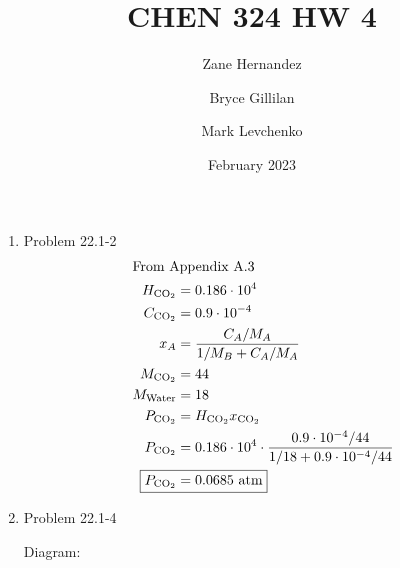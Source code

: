 \documentclass[12pt]{article}
\title{CHEN 324 HW 4}
\author[1]{Zane Hernandez}
\author[2]{Bryce Gillilan}
\author[3]{Mark Levchenko}
\affil[1,2,3]{Group 11}
\date{February 2023}
\begin{document}

\begin{enumerate}

\newpage
    \item Problem 22.1-2
    \begin{align*}
        \intertext{From Appendix A.3}
        H_{\mathrm{CO}_2} &= 0.186 \cdot 10^{4} \\
        C_{\mathrm{CO}_2} &= 0.9 \cdot 10^{-4} \\
        x_A &= \frac{C_A/M_A}{1/M_B + C_A/M_A} \\
        M_{\mathrm{CO}_2} &= 44 \\
        M_{\mathrm{Water}} &= 18 \\
        P_{\mathrm{CO}_2} &= H_{\mathrm{CO}_2} x_{\mathrm{CO}_2} \\
        P_{\mathrm{CO}_2} &= 0.186 \cdot 10^{4} \cdot \frac{0.9 \cdot 10^{-4}/44}{1/18 + 0.9 \cdot 10^{-4}/44} \\
        \Aboxed{P_{\mathrm{CO}_2} &= 0.0685 \text{ atm} }
    \end{align*}

\newpage
    \item Problem 22.1-4

    Diagram:


\end{enumerate}
\end{document}
